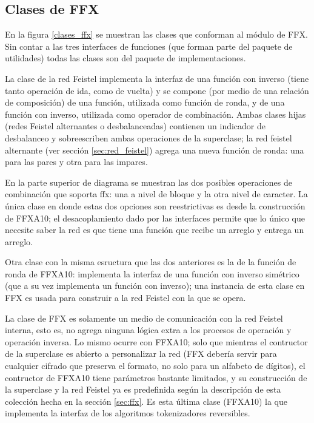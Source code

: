 %
%
%

\subsection{Clases de FFX}

En la figura \ref{clases_ffx} se muestran las clases que conforman al módulo de
FFX. Sin contar a las tres interfaces de funciones (que forman parte del paquete
de utilidades) todas las clases son del paquete de implementaciones.

La clase de la red Feistel implementa la interfaz de una función con inverso
(tiene tanto operación de ida, como de vuelta) y se compone (por medio de una
relación de composición) de una función, utilizada como función de ronda, y de
una función con inverso, utilizada como operador de combinación. Ambas clases
hijas (redes Feistel alternantes o desbalanceadas) contienen un indicador de
desbalanceo y sobreescriben ambas operaciones de la superclase; la red feistel
alternante (ver sección \ref{sec:red_feistel}) agrega una nueva función
de ronda: una para las pares y otra para las impares.

En la parte superior de diagrama se muestran las dos posibles operaciones de
combinación que soporta ffx: una a nivel de bloque y la otra nivel de caracter.
La única clase en donde estas dos opciones son reestrictivas es desde la
construcción de FFXA10; el desacoplamiento dado por las interfaces permite que
lo único que necesite saber la red es que tiene una función que recibe un
arreglo y entrega un arreglo.

Otra clase con la misma esructura que las dos anteriores es la de la función de
ronda de FFXA10: implementa la interfaz de una función con inverso simétrico
(que a su vez implementa un función con inverso); una instancia de esta clase
en FFX es usada para construir a la red Feistel con la que se opera.

La clase de FFX es solamente un medio de comunicación con la red Feistel
interna, esto es, no agrega ninguna lógica extra a los procesos de operación y
operación inversa. Lo mismo ocurre con FFXA10; solo que mientras el contructor
de la superclase es abierto a personalizar la red (FFX debería servir para
cualquier cifrado que preserva el formato, no solo para un alfabeto de
dígitos), el contructor de FFXA10 tiene parámetros bastante limitados, y su
construcción de la superclase y la red Feistel ya es predefinida según la
descripción de esta colección hecha en la sección \ref{sec:ffx}. Es esta última
clase (FFXA10) la que implementa la interfaz de los algoritmos tokenizadores
reversibles.

